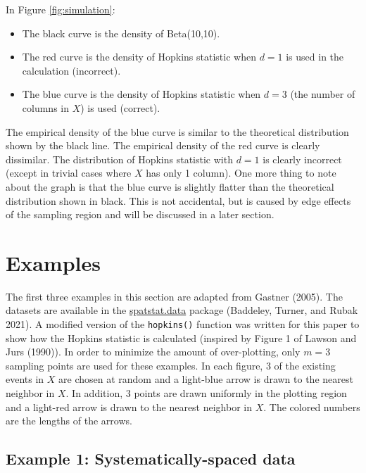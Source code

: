 In Figure \ref{fig:simulation}:

\begin{itemize}
\tightlist
\item
  The black curve is the density of Beta(10,10).
\item
  The red curve is the density of Hopkins statistic when \(d=1\) is used in the calculation (incorrect).
\item
  The blue curve is the density of Hopkins statistic when \(d=3\) (the number of columns in \(X\)) is used (correct).
\end{itemize}

The empirical density of the blue curve is similar to the theoretical distribution shown by the black line. The empirical density of the red curve is clearly dissimilar. The distribution of Hopkins statistic with \(d=1\) is clearly incorrect (except in trivial cases where \(X\) has only 1 column). One more thing to note about the graph is that the blue curve is slightly flatter than the theoretical distribution shown in black. This is not accidental, but is caused by edge effects of the sampling region and will be discussed in a later section.

\hypertarget{examples}{%
\section{Examples}\label{examples}}

The first three examples in this section are adapted from Gastner (2005). The datasets are available in the \href{https://cran.r-project.org/web/packages/spatstat.data/index.html}{spatstat.data} package (Baddeley, Turner, and Rubak 2021). A modified version of the \texttt{hopkins()} function was written for this paper to show how the Hopkins statistic is calculated (inspired by Figure 1 of Lawson and Jurs (1990)). In order to minimize the amount of over-plotting, only \(m=3\) sampling points are used for these examples. In each figure, 3 of the existing events in \(X\) are chosen at random and a light-blue arrow is drawn to the nearest neighbor in \(X\). In addition, 3 points are drawn uniformly in the plotting region and a light-red arrow is drawn to the nearest neighbor in \(X\). The colored numbers are the lengths of the arrows.

\hypertarget{example-1-systematically-spaced-data}{%
\subsection{Example 1: Systematically-spaced data}\label{example-1-systematically-spaced-data}}

